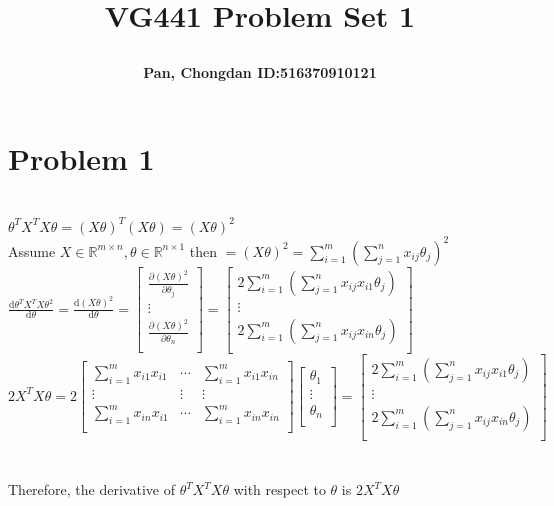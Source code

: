 \documentclass[a4paper]{article}
\title{\Large \textbf{VG441 Problem Set 1}\\
\author{\textbf{Pan, Chongdan ID:516370910121}\\
}
}
\newcommand{\reals}{{\mathbb{R}}}
\begin{document}
\maketitle
\section{Problem 1}
\quad
\\$\theta^TX^TX\theta=(X\theta)^T(X\theta)=(X\theta)^2$
\\Assume $X\in\reals^{m\times n},\theta\in\reals^{n\times1}$ then $=(X\theta)^2=\sum_{i=1}^m(\sum_{j=1}^nx_{ij}\theta_j)^2$
\\$\frac{\mathrm{d}\theta^TX^TX\theta^2}{\mathrm{d}\theta}=\frac{\mathrm{d}(X\theta)^2}{\mathrm{d}\theta}=\left[\begin{array}{c}   
    \frac{\partial (X\theta)^2}{\partial \theta_j}\\ 
    \vdots\\  
    \frac{\partial (X\theta)^2}{\partial \theta_n}\\  
  \end{array}\right]
  =\left[\begin{array}{c}   
    2\sum_{i=1}^m(\sum_{j=1}^nx_{ij}x_{i1}\theta_j)\\ 
    \vdots\\  
    2\sum_{i=1}^m(\sum_{j=1}^nx_{ij}x_{in}\theta_j)\\  
  \end{array}\right]$
\\$2X^TX\theta=2\left[\begin{array}{ccc}   
    \sum_{i=1}^mx_{i1}x_{i1} &\cdots & \sum_{i=1}^mx_{i1}x_{in}\\ 
    \vdots&\vdots &\vdots\\  
    \sum_{i=1}^mx_{in}x_{i1} &\cdots & \sum_{i=1}^mx_{in}x_{in}\\  
  \end{array}\right]\left[\begin{array}{c}
    \theta_1\\
    \vdots\\
    \theta_n\\    
  \end{array}\right]=\left[\begin{array}{c}   
    2\sum_{i=1}^m(\sum_{j=1}^nx_{ij}x_{i1}\theta_j)\\ 
    \vdots\\  
    2\sum_{i=1}^m(\sum_{j=1}^nx_{ij}x_{in}\theta_j)\\  
  \end{array}\right]$
\\\\\\Therefore, the derivative of $\theta^TX^TX\theta$ with respect to $\theta$ is $2X^TX\theta$
\end{document}
